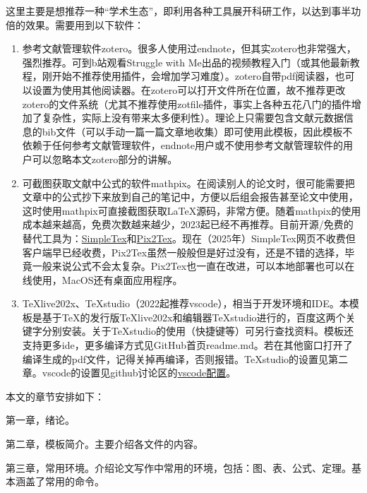 这里主要是想推荐一种“学术生态”，即利用各种工具展开科研工作，以达到事半功倍的效果。需要用到以下软件：
\begin{enumerate}[topsep = 0 pt, itemsep= 0 pt, parsep=0pt, partopsep=0pt, leftmargin=44pt, itemindent=0pt, labelsep=6pt, label=(\arabic*)]
	\item 	参考文献管理软件zotero\cite{_m}。很多人使用过endnote，但其实zotero也非常强大，强烈推荐。可到b站观看Struggle with Me出品的视频教程\cite{_k}入门（或其他最新教程，刚开始不推荐使用插件，会增加学习难度）。zotero自带pdf阅读器，也可以设置为使用其他阅读器。在zotero可以打开文件所在位置，故不推荐更改zotero的文件系统（尤其不推荐使用zotfile插件，事实上各种五花八门的插件增加了复杂性，实际上没有带来太多便利性）。理论上只需要包含文献元数据信息的bib文件（可以手动一篇一篇文章地收集）即可使用此模板，因此模板不依赖于任何参考文献管理软件，endnote用户或不使用参考文献管理软件的用户可以忽略本文zotero部分的讲解。
	\item	可截图获取文献中公式的软件mathpix\cite{_h}。在阅读别人的论文时，很可能需要把文章中的公式抄下来放到自己的笔记中，方便以后组会报告甚至论文中使用，这时使用mathpix可直接截图获取\LaTeX{}源码，非常方便。随着mathpix的使用成本越来越高，免费次数越来越少，2023起已经不再推荐。目前开源/免费的替代工具为：\href{https://www.simpletex.cn/}{SimpleTex}和\href{https://p2t.breezedeus.com/}{Pix2Tex}。现在（2025年）SimpleTex网页不收费但客户端早已经收费，Pix2Tex虽然一般般但是好过没有，还是不错的选择，毕竟一般来说公式不会太复杂。Pix2Tex也一直在改进，可以本地部署也可以在线使用，MacOS还有桌面应用程序。
	\item	TeXlive202x、TeXstudio（2022起推荐vscode），相当于开发环境和IDE。本模板是基于TeX的发行版TeXlive202x和编辑器TeXstudio进行的，百度这两个关键字分别安装。关于TeXstudio的使用（快捷键等）可另行查找资料。模板还支持更多ide，更多编译方式见GitHub首页readme.md。若在其他窗口打开了编译生成的pdf文件，记得关掉再编译，否则报错。TeXstudio的设置见第二章。vscode的设置见github讨论区的\href{https://github.com/mengchaoheng/SCUT_thesis/discussions/6}{vscode配置}。
\end{enumerate}

本文的章节安排如下：

第一章，绪论。

第二章，模板简介。主要介绍各文件的内容。

第三章，常用环境。介绍论文写作中常用的环境，包括：图、表、公式、定理。基本涵盖了常用的命令。




